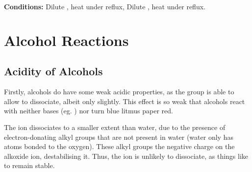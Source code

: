 			\vspace{1.5em}
			\vbox{\textbf{Conditions:}	\tabto{35mm}Dilute , heat under reflux, 
										\tabto{35mm}Dilute , heat under reflux.}





	\pagebreak
	\section{Alcohol Reactions}

		\subsection{Acidity of Alcohols}

			Firstly, alcohols do have some weak acidic properties, as the  group is able to allow  to dissociate, albeit
			only slightly. This effect is so weak that alcohols react with neither bases (eg. ) nor turn blue litmus paper red.

			The  ion dissociates to a smaller extent than water, due to the presence of electron-donating alkyl groups that are
			not present in water (water only has  atoms bonded to the oxygen). These alkyl groups  the negative
			charge on the alkoxide ion, destabilising it. Thus, the  ion is unlikely to dissociate, as things like to remain stable.

